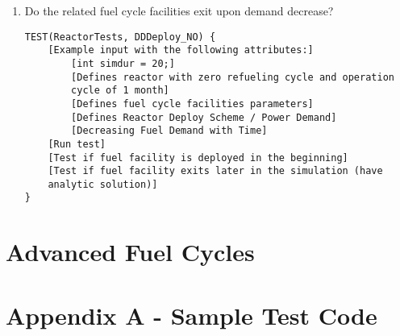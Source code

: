 \documentclass[12pt,letterpaper]{article}
\begin{document}
\begin{enumerate}
\item Do the related fuel cycle facilities exit upon demand decrease?
\begin{verbatim}
TEST(ReactorTests, DDDeploy_NO) {
    [Example input with the following attributes:]
        [int simdur = 20;]
        [Defines reactor with zero refueling cycle and operation 
        cycle of 1 month]
        [Defines fuel cycle facilities parameters]
        [Defines Reactor Deploy Scheme / Power Demand]
        [Decreasing Fuel Demand with Time]
    [Run test]
    [Test if fuel facility is deployed in the beginning]
    [Test if fuel facility exits later in the simulation (have 
    analytic solution)]
}
\end{verbatim}


\end{enumerate}





\section{Advanced Fuel Cycles}


\section{Appendix A - Sample Test Code }
\end{document}
